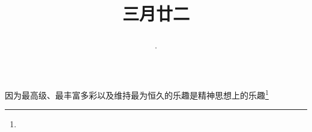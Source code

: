\title{\date[d=30,m=4,y=2024][year:cn-y,年,month:cn,day:cn,日,·,weekday]·三月廿二 }
因为最高级、最丰富多彩以及维持最为恒久的乐趣是精神思想上的乐趣\footnote{ }

